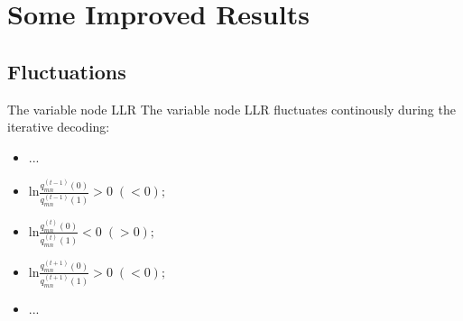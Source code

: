 \def\CTeXPreproc{Created by ctex v0.2.12, don't edit!}\documentclass{beamer}
\begin{document}
\section{Some Improved Results}

\subsection{Fluctuations}
\begin{frame}
    \begin{block}{The variable node LLR}
        The variable node LLR fluctuates continously during the iterative
        decoding:
        \begin{itemize}
        \item \quad...
        \item ln$\frac{q_{mn}^{(t-1)}(0)}{q_{mn}^{(t-1)}(1)}>0 \;(<0);$
        \item ln$\frac{q_{mn}^{(t)}(0)}{q_{mn}^{(t)}(1)}<0 \;(>0);$
        \item ln$\frac{q_{mn}^{(t+1)}(0)}{q_{mn}^{(t+1)}(1)}>0 \;(<0);$
        \item \quad...
        \end{itemize}
    \end{block}
\end{frame}
\end{document}
